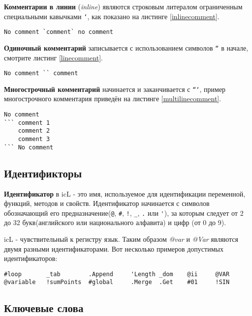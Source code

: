 \documentclass[a4paper, 14pt]{extarticle}
\begin{document}
\textbf{Комментарии в линии} (\textit{inline}) являются строковым литералом ограниченным специальными кавычками \texttt{`}, как показано на листинге \ref{inlinecomment}.
	
\begin{lstlisting}[caption=Комментарий в линии,label=inlinecomment]
No comment `comment` no comment
\end{lstlisting}
	
\textbf{Одиночный комментарий} записывается с использованием символов \texttt{``} в начале, смотрите листинг \ref{linecomment}.
	
\begin{lstlisting}[caption=Одиночный комментарий,label=linecomment]
No comment `` comment
\end{lstlisting}
	
\textbf{Многострочный комментарий} начинается и заканчивается с \texttt{```}, пример многострочного комментария приведён на листинге \ref{multilinecomment}.
	
\begin{lstlisting}[caption=Многострочный комментарий,label=multilinecomment]
No comment
``` comment 1
	comment 2
	comment 3
``` No comment
\end{lstlisting}
	
\subsection{Идентификторы}
	
\textbf{Идентификатор} в icL - это имя, используемое для идентификации переменной, функций, методов и свойств. Идентификатор начинается с символов обозначающий его предназначение(\lstinline`@`, \lstinline`#`, \lstinline`!`, \lstinline`_`, \lstinline`.` или \lstinline`'`), за которым следует от 2 до 32 букв(английского или национального алфавита) и цифр (от 0 до 9).
	
icL - чувствительный к регистру язык. Таким образом \textit{@var} и \textit{@Var} являются двумя разными идентификаторами. Вот несколько примеров допустимых идентификаторов:
	
\begin{lstlisting}[numbers=none]
#loop		_tab		.Append		'Length	_dom	@ii 	@VAR
@variable	!sumPoints	#global		.Merge	.Get	#01		!SIN
\end{lstlisting}
	
\subsection{Ключевые слова}
	
\end{document}
